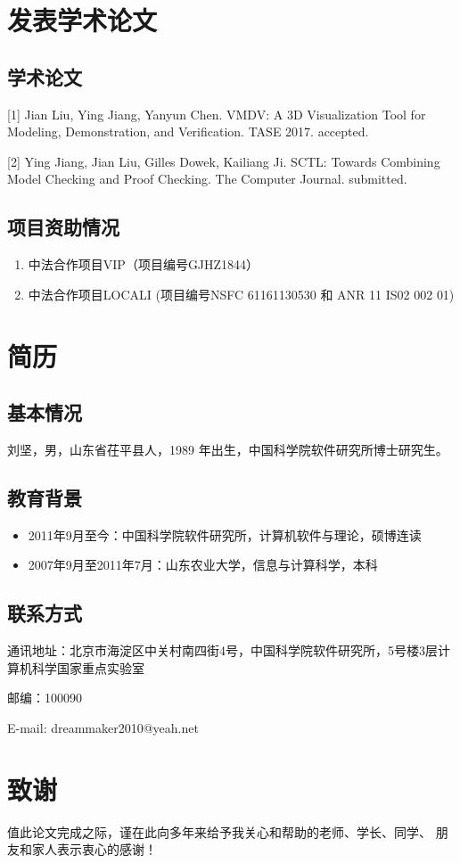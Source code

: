 \chapter{发表学术论文}

\section*{学术论文}

\hspace{-0.9cm}[1] Jian Liu, Ying Jiang, Yanyun Chen. VMDV: A 3D Visualization Tool for Modeling, Demonstration, and Verification. TASE 2017. accepted.

\hspace{-0.9cm}[2] Ying Jiang, Jian Liu, Gilles Dowek, Kailiang Ji. SCTL: Towards Combining Model Checking and Proof Checking. The Computer Journal. submitted.

\section*{项目资助情况}
\begin{enumerate}
	\item 中法合作项目VIP（项目编号GJHZ1844）
	\item 中法合作项目LOCALI (项目编号NSFC 61161130530 和 ANR 11 IS02 002 01)
\end{enumerate}



\chapter{简\quad 历}

\section*{基本情况}

刘坚，男，山东省茌平县人，1989 年出生，中国科学院软件研究所博士研究生。

\section*{教育背景}
\begin{itemize}
	\item 2011年9月至今：中国科学院软件研究所，计算机软件与理论，硕博连读
	\item 2007年9月至2011年7月：山东农业大学，信息与计算科学，本科
\end{itemize}

\section*{联系方式}

通讯地址：北京市海淀区中关村南四街4号，中国科学院软件研究所，5号楼3层计算机科学国家重点实验室

邮编：100090

E-mail: dreammaker2010@yeah.net



\chapter{致\quad 谢}

值此论文完成之际，谨在此向多年来给予我关心和帮助的老师、学长、同学、
朋友和家人表示衷心的感谢！

